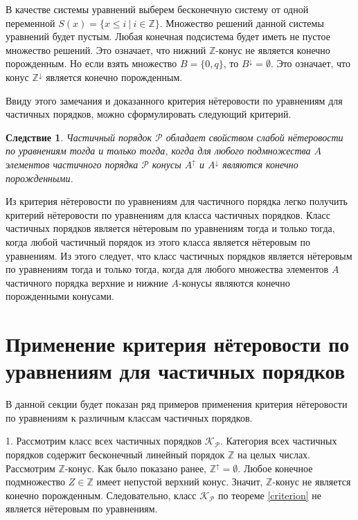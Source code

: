 \documentclass[12pt]{article}
\theoremstyle{break}
\newtheorem{Con}{Следствие}
\def\P{\mathcal{P}}
\begin{document}
		В качестве системы уравнений выберем бесконечную систему от одной переменной $S(x) = \{x\leqslant i\ |\ i\in \mathbb{Z}\}.$ Множество решений данной системы уравнений будет пустым. Любая конечная подсистема будет иметь не пустое множество решений. Это означает, что нижний $\mathbb{Z}$-конус не является конечно порожденным. Но если взять множество $B = \{0, q\}$, то $B^{\downarrow} = \emptyset$. Это означает, что конус $\mathbb{Z}^{\downarrow}$ является конечно порожденным.

		Ввиду этого замечания и доказанного критерия нётеровости по уравнениям для частичных порядков, можно сформулировать следующий критерий.

		\begin{Con}
			Частичный порядок $\P$ обладает свойством слабой нётеровости по уравнениям тогда и только тогда, когда для любого подмножества $A$ элементов частичного порядка $\P$ конусы $A^{\uparrow}$ и $A^{\downarrow}$ являются конечно порожденными.
		\end{Con}

		Из критерия нётеровости по уравнениям для частичного порядка легко получить критерий нётеровости по уравнениям для класса частичных порядков. Класс частичных порядков является нётеровым по уравнениям тогда и только тогда, когда любой частичный порядок из этого класса является нётеровым по уравнениям. Из этого следует, что класс частичных порядков является нётеровым по уравнениям тогда и только тогда, когда для любого множества элементов $A$ частичного порядка верхние и нижние $A$-конусы являются конечно порожденными конусами.


	\section{Применение критерия нётеровости по уравнениям для частичных порядков}
		В данной секции будет показан ряд примеров применения критерия нётеровости по уравнениям к различным классам частичных порядков.

		1. Рассмотрим класс всех частичных порядков $\mathcal{K}_{\P}.$ Категория всех частичных порядков содержит бесконечный линейный порядок $\mathbb{Z}$ на целых числах. Рассмотрим $\mathbb{Z}$-конус. Как было показано ранее, $\mathbb{Z}^{\uparrow} = \emptyset$. Любое конечное подмножество $Z\in\mathbb{Z}$ имеет непустой верхний конус. Значит, $\mathbb{Z}$-конус не является конечно порожденным. Следовательно, класс $\mathcal{K}_{\P}$ по теореме \ref{criterion} не является нётеровым по уравнениям.
\end{document}
